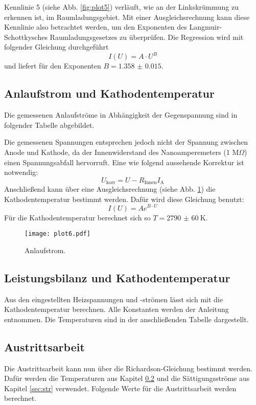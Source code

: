 Kennlinie 5 (siehe Abb. \ref{fig:plot5}) verläuft, wie an der Linkskrümmung zu erkennen ist, im Raumladungsgebiet.
Mit einer Ausgleichsrechnung kann diese Kennlinie also betrachtet werden, um den Exponenten des Langmuir-Schottkysches Raumladungsgesetzes zu überprüfen.
Die Regression wird mit folgender Gleichung durchgeführt
\begin{equation}
  I(U) = A \cdot U^B
\end{equation}
und liefert für den Exponenten $B = \num{1.358(15)}$.

\subsection{Anlaufstrom und Kathodentemperatur}
\label{sec:anlauf}

Die gemessenen Anlaufströme in Abhängigkeit der Gegenspannung sind in folgender Tabelle abgebildet.

Die gemessenen Spannungen entsprechen jedoch nicht der Spannung zwischen Anode und Kathode, da der Innenwiderstand des Nanoamperemeters (1 M$\Omega$) einen Spannungsabfall hervorruft.
Eine wie folgend aussehende Korrektur ist notwendig:
\begin{equation*}
  U_\text{korr} = U - R_\text{Innen} I_\text{A}
\end{equation*}
Anschließend kann über eine Ausgleichsrechnung (siehe Abb. \ref{fig:plot6}) die Kathodentemperatur bestimmt werden.
Dafür wird diese Gleichung benutzt:
\begin{equation}
  I(U) = A e^{B \cdot U}
\end{equation}
Für die Kathodentemperatur berechnet sich so $T = \SI{2790(60)}{\kelvin}$.
\begin{figure}
  \centering
  \texttt{[image: plot6.pdf]}
  \caption{Anlaufstrom.}
  \label{fig:plot6}
\end{figure}

\subsection{Leistungsbilanz und Kathodentemperatur}
\label{sec:temp}

Aus den eingestellten Heizspannungen und -strömen lässt sich mit die Kathodentemperatur berechnen.
Alle Konstanten werden der Anleitung entnommen.
Die Temperaturen sind in der anschließenden Tabelle dargestellt.

\subsection{Austrittsarbeit}

Die Austrittsarbeit kann nun über die Richardson-Gleichung bestimmt werden.
Dafür werden die Temperaturen aus Kapitel \ref{sec:temp} und die Sättigungsströme aus Kapitel \ref{sec:str} verwendet.
Folgende Werte für die Austrittsarbeit werden berechnet.
